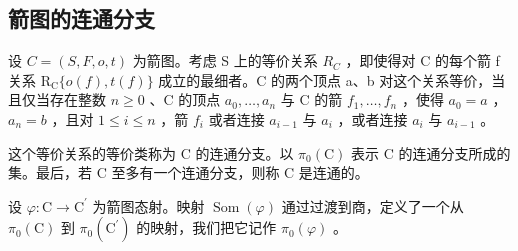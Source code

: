 \subsection{箭图的连通分支}

设 \(C = (S, F, o, t)\) 为箭图。考虑 S 上的等价关系 \(R_{C}\) ，即使得对 C 的每个箭 f 关系 \(\mathrm{R}_{\mathrm{C}}\{o(f), t(f)\}\) 成立的最细者。C 的两个顶点 a、b 对这个关系等价，当且仅当存在整数 \(n \geqslant 0\) 、C 的顶点 \(a_{0}, \ldots, a_{n}\) 与 C 的箭 \(f_{1}, \ldots, f_{n}\) ，使得 \(a_{0} = a\) ，\(a_{n} = b\) ，且对 \(1 \leqslant i \leqslant n\) ，箭 \(f_{i}\) 或者连接 \(a_{i-1}\) 与 \(a_{i}\) ，或者连接 \(a_{i}\) 与 \(a_{i-1}\) 。

这个等价关系的等价类称为 C 的连通分支。以 \(\pi_0(\mathrm{C})\) 表示 C 的连通分支所成的集。最后，若 C 至多有一个连通分支，则称 C 是连通的。

设 \(\varphi\colon\mathrm{C}\to\mathrm{C}^{\prime}\) 为箭图态射。映射 \(\operatorname{Som}(\varphi)\) 通过过渡到商，定义了一个从 \(\pi_{0}(\mathrm{C})\) 到 \(\pi_{0}(\mathrm{C}^{\prime})\) 的映射，我们把它记作 \(\pi_{0}(\varphi)\) 。

